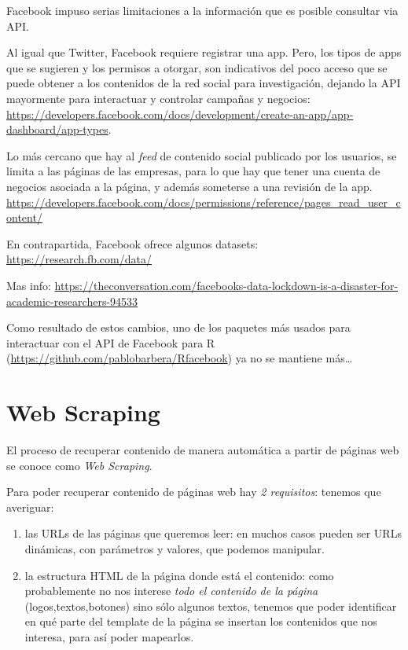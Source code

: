 \documentclass[
]{book}
\providecommand{\tightlist}{%
  \setlength{\itemsep}{0pt}\setlength{\parskip}{0pt}}
\begin{document}
Facebook impuso serias limitaciones a la información que es posible consultar via API.

Al igual que Twitter, Facebook requiere registrar una app. Pero, los tipos de apps que se sugieren y los permisos a otorgar, son indicativos del poco acceso que se puede obtener a los contenidos de la red social para investigación, dejando la API mayormente para interactuar y controlar campañas y negocios: \url{https://developers.facebook.com/docs/development/create-an-app/app-dashboard/app-types}.

Lo más cercano que hay al \emph{feed} de contenido social publicado por los usuarios, se limita a las páginas de las empresas, para lo que hay que tener una cuenta de negocios asociada a la página, y además someterse a una revisión de la app. \url{https://developers.facebook.com/docs/permissions/reference/pages_read_user_content/}

En contrapartida, Facebook ofrece algunos datasets: \url{https://research.fb.com/data/}

Mas info: \url{https://theconversation.com/facebooks-data-lockdown-is-a-disaster-for-academic-researchers-94533}

Como resultado de estos cambios, uno de los paquetes más usados para interactuar con el API de Facebook para R (\url{https://github.com/pablobarbera/Rfacebook}) ya no se mantiene más\ldots{}

\hypertarget{web-scraping}{%
\section{Web Scraping}\label{web-scraping}}

El proceso de recuperar contenido de manera automática a partir de páginas web se conoce como \emph{Web Scraping}.

Para poder recuperar contenido de páginas web hay \emph{2 requisitos}: tenemos que averiguar:

\begin{enumerate}
\def\labelenumi{\arabic{enumi}.}
\tightlist
\item
  las URLs de las páginas que queremos leer: en muchos casos pueden ser URLs dinámicas, con parámetros y valores, que podemos manipular.
\item
  la estructura HTML de la página donde está el contenido: como probablemente no nos interese \emph{todo el contenido de la página} (logos,textos,botones) sino sólo algunos textos, tenemos que poder identificar en qué parte del template de la página se insertan los contenidos que nos interesa, para así poder mapearlos.
\end{enumerate}
\end{document}
